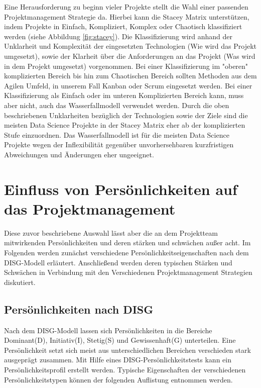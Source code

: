 \documentclass[twocolumn,10pt]{asme2ej}
\begin{document}
Eine Herausforderung zu beginn vieler Projekte stellt die Wahl einer passenden Projektmanagement Strategie da. Hierbei kann die Stacey Matrix \cite{Stacey2011StrategicMA} unterstützen, indem Projekte in Einfach, Kompliziert, Komplex oder Chaotisch klassifiziert werden (siehe Abbildung \ref{fig:stacey}). Die Klassifizierung wird anhand der Unklarheit und Komplexität der eingesetzten Technologien (Wie wird das Projekt umgesetzt), sowie der Klarheit über die Anforderungen an das Projekt (Was wird in dem Projekt umgesetzt) vorgenommen. Bei einer Klassifizierung im "oberen" komplizierten Bereich bis hin zum Chaotischen Bereich sollten Methoden aus dem Agilen Umfeld, in unserem Fall Kanban oder Scrum eingesetzt werden. Bei einer Klassifizierung als Einfach oder im unteren Komplizierten Bereich kann, muss aber nicht, auch das Wasserfallmodell verwendet werden. Durch die oben beschriebenen Unklarheiten bezüglich der Technologien sowie der Ziele sind die meisten Data Science Projekte in der Stacey Matrix eher ab der komplizierten Stufe einzuordnen. Das Wasserfallmodell ist für die meisten Data Science Projekte wegen der Inflexibilität gegenüber unvorhersehbaren kurzfristigen Abweichungen und Änderungen  eher ungeeignet.

\section{Einfluss von Persönlichkeiten auf das Projektmanagement}\label{sec:2}
Diese zuvor beschriebene Auswahl lässt aber die an dem Projektteam mitwirkenden Persönlichkeiten und deren stärken und schwächen außer acht. Im Folgenden werden zunächst verschiedene Persönlichkeitseigenschaften nach dem DISG-Modell erläutert. Anschließend werden deren typischen Stärken und Schwächen in Verbindung mit den Verschiedenen Projektmanagement Strategien diskutiert.

\subsection{Persönlichkeiten nach DISG}
Nach dem DISG-Modell \cite{disc} lassen sich Persönlichkeiten in die Bereiche Dominant(D), Initiativ(I), Stetig(S) und Gewissenhaft(G) unterteilen. Eine Persönlichkeit setzt sich meist aus unterschiedlichen Bereichen verschieden stark ausgeprägt zusammen. Mit Hilfe eines DISG-Persönlichkeitstests kann ein Persönlichkeitsprofil erstellt werden. Typische Eigenschaften der verschiedenen Persönlichkeitstypen können der folgenden Auflistung entnommen werden.
\end{document}
